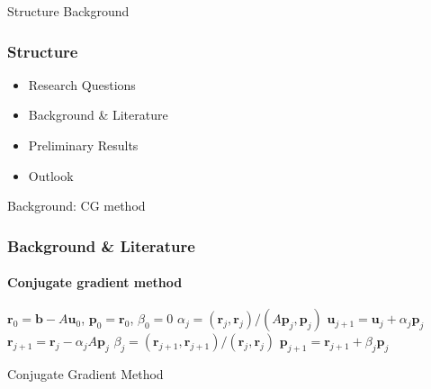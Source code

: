 \begin{frame}[label=background]{Structure Background}
    \frametitle{Structure}
    \begin{itemize}
        \item Research Questions
        \item {\color{tud grapefruit}Background \& Literature}
        \item Preliminary Results
        \item Outlook
    \end{itemize}
\end{frame}

\footerinfootnotestrue
\begin{frame}[label=background,fragile]{Background: CG method}
    \frametitle{Background \& Literature}
    \framesubtitle{Conjugate gradient method}
    \begin{algorithm}[H]
        \begin{algorithmic}
            \State $\mathbf{r}_0 = \mathbf{b} - A\mathbf{u}_0$, $\mathbf{p}_0 = \mathbf{r}_0$, $\beta_0 = 0$
            \State $\alpha_j = (\mathbf{r}_j, \mathbf{r}_j) / (A \mathbf{p}_j, \mathbf{p}_j)$
            \State $\mathbf{u}_{j+1} = \mathbf{u}_j + \alpha_j \mathbf{p}_j$
            \State $\mathbf{r}_{j+1} = \mathbf{r}_j - \alpha_j A \mathbf{p}_j$
            \State $\beta_j = (\mathbf{r}_{j+1}, \mathbf{r}_{j+1}) / (\mathbf{r}_j, \mathbf{r}_j)$
            \State $\mathbf{p}_{j+1} = \mathbf{r}_{j+1} + \beta_j \mathbf{p}_j$
            \EndFor
        \end{algorithmic}
        \caption{Conjugate Gradient Method \cite{iter_method_saad}}
    \end{algorithm}
\end{frame}

